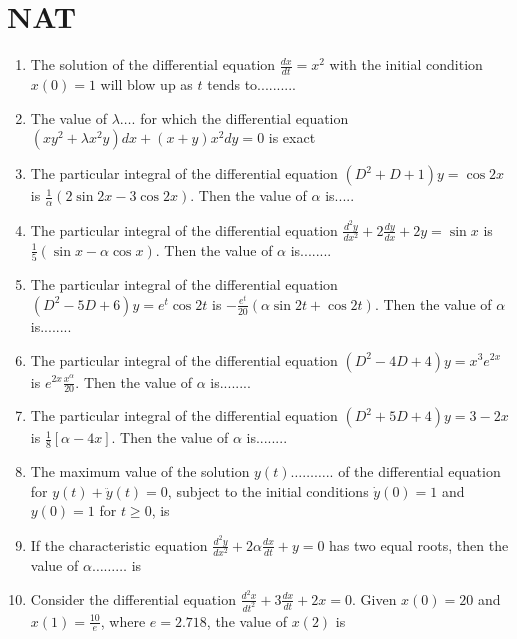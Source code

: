 \section{NAT}
\begin{enumerate}
	\item The solution of the differential equation $\frac{d x}{d t}=x^{2}$ with the initial condition $x(0)=1$ will blow up as $t$ tends to..........
	\item The value of $\lambda \ldots .$ for which the differential equation $\left(x y^{2}+\lambda x^{2} y\right) d x+(x+y) x^{2} d y=0$ is exact
	\item The particular integral of the differential equation $\left(D^{2}+D+1\right) y=\cos 2 x$ is $\frac{1}{\alpha}(2 \sin 2 x-3 \cos 2 x) .$ Then the value of $\alpha$ is.....
	\item The particular integral of the differential equation $\frac{d^{2} y}{d x^{2}}+2 \frac{d y}{d x}+2 y=\sin x$ is $\frac{1}{5}(\sin x-\alpha \cos x) .$ Then the value of $\alpha$ is........
	\item The particular integral of the differential equation $\left(D^{2}-5 D+6\right) y=e^{t} \cos 2 t$ is $-\frac{e^{t}}{20}(\alpha \sin 2 t+\cos 2 t)$. Then the value of $\alpha$ is........
	\item The particular integral of the differential equation $\left(D^{2}-4 D+4\right) y=x^{3} e^{2 x}$ is $e^{2 x} \frac{x^{\alpha}}{20}$. Then the value of $\alpha$ is........
	\item The particular integral of the differential equation $\left(D^{2}+5 D+4\right) y=3-2 x$ is $\frac{1}{8}[\alpha-4 x]$.
	Then the value of $\alpha$ is........
	\item The maximum value of the solution $y(t) \ldots \ldots \ldots . .$ of the differential equation for $y(t)+\ddot{y}(t)=0$, subject to the initial conditions $\dot{y}(0)=1$ and $y(0)=1$ for $t \geq 0$, is
	\item If the characteristic equation $\frac{d^{2} y}{d x^{2}}+2 \alpha \frac{d x}{d t}+y=0$ has two equal roots, then the value of $\alpha \ldots \ldots \ldots$ is
	\item Consider the differential equation $\frac{d^{2} x}{d t^{2}}+3 \frac{d x}{d t}+2 x=0 .$ Given $x(0)=20$ and $x(1)=\frac{10}{e}$, where $e=2.718$, the value of $x(2)$ is
\end{enumerate}
